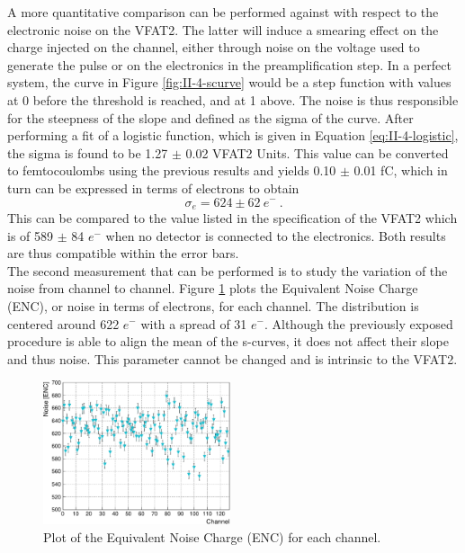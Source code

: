       A more quantitative comparison can be performed against \cite{Aspell:1069906} with respect to the electronic noise on the VFAT2. The latter will induce a smearing effect on the charge injected on the channel, either through noise on the voltage used to generate the pulse or on the electronics in the preamplification step. In a perfect system, the curve in Figure \ref{fig:II-4-scurve} would be a step function with values at 0 before the threshold is reached, and at 1 above. The noise is thus responsible for the steepness of the slope and defined as the sigma of the curve. After performing a fit of a logistic function, which is given in Equation \ref{eq:II-4-logistic}, the sigma is found to be 1.27 $\pm$ 0.02 VFAT2 Units. This value can be converted to femtocoulombs using the previous results and yields 0.10 $\pm$ 0.01 fC, which in turn can be expressed in terms of electrons to obtain
      \begin{equation}
        \sigma_e = 624 \pm 62 \ e^- \ .
      \end{equation}
      This can be compared to the value listed in the specification of the VFAT2 which is of 589 $\pm$ 84 $e^-$ when no detector is connected to the electronics. Both results are thus compatible within the error bars. \\

      The second measurement that can be performed is to study the variation of the noise from channel to channel. Figure \ref{fig:II-4-noise} plots the Equivalent Noise Charge (ENC), or noise in terms of electrons, for each channel. The distribution is centered around 622 $e^-$ with a spread of 31 $e^-$. Although the previously exposed procedure is able to align the mean of the s-curves, it does not affect their slope and thus noise. This parameter cannot be changed and is intrinsic to the VFAT2.

      \begin{figure}[t!]
        \centering
        \includegraphics[width=0.49\textwidth]{img/plots/cEnoise_Disp-crop}
        \caption{Plot of the Equivalent Noise Charge (ENC) for each channel.}
        \label{fig:II-4-noise}
      \end{figure}

